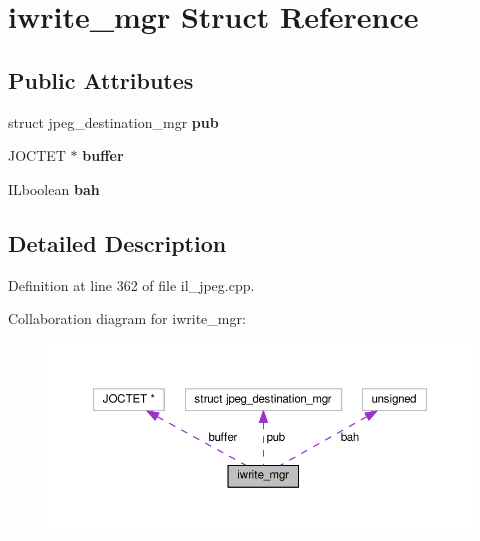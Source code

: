 \hypertarget{structiwrite__mgr}{}\section{iwrite\+\_\+mgr Struct Reference}
\label{structiwrite__mgr}
\subsection*{Public Attributes}
\begin{DoxyCompactItemize}
\item 
\mbox{\label{structiwrite__mgr_ae1c8c4aabc6ca6fc612e23ab1a89d6f8}} 
struct jpeg\+\_\+destination\+\_\+mgr {\bfseries pub}
\item 
\mbox{\label{structiwrite__mgr_a6bd5e198c01f2c2c05da94046721cb5c}} 
J\+O\+C\+T\+ET $\ast$ {\bfseries buffer}
\item 
\mbox{\label{structiwrite__mgr_ae25c39c77e98c1bd1ca14156e439b6f4}} 
I\+Lboolean {\bfseries bah}
\end{DoxyCompactItemize}


\subsection{Detailed Description}


Definition at line 362 of file il\+\_\+jpeg.\+cpp.



Collaboration diagram for iwrite\+\_\+mgr\+:
\nopagebreak
\begin{figure}[H]
\begin{center}
\leavevmode
\includegraphics[width=350pt]{d6/d80/structiwrite__mgr__coll__graph}
\end{center}
\end{figure}


